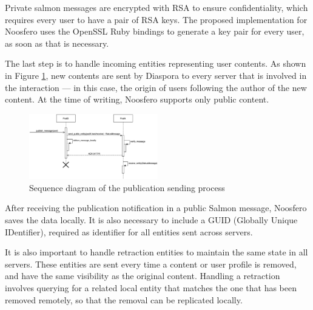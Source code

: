 Private salmon messages are encrypted with RSA to ensure
confidentiality, which requires every user to have a pair of RSA keys.
The proposed implementation for Noosfero uses the OpenSSL Ruby bindings
to generate a key pair for every user, as soon as that is necessary.

The last step is to handle incoming entities representing user contents.
As shown in Figure \ref{fig:seq_publication}, new contents are sent by
Diaspora to every server that is involved in the interaction --- in this
case, the origin of users following the author of the new content. At
the time of writing, Noosfero supports only public content.

\begin{figure}[h]
	\centering
		\includegraphics[width=0.5\textwidth]{figures/seq_publicacao.eps}
	\caption{Sequence diagram of the publication sending process}
	\label{fig:seq_publication}
\end{figure}

After receiving the publication notification in a public Salmon message,
Noosfero  saves the data locally. It is also necessary to include a GUID
(Globally Unique IDentifier), required as identifier for all entities sent
across servers.

It is also important to handle retraction entities to maintain the same state
in all servers. These entities are sent every time a content or user profile is
removed, and have the same visibility as the original content.  Handling a
retraction involves querying for a related local entity that matches the one
that has been removed remotely, so that the removal can be replicated locally.
